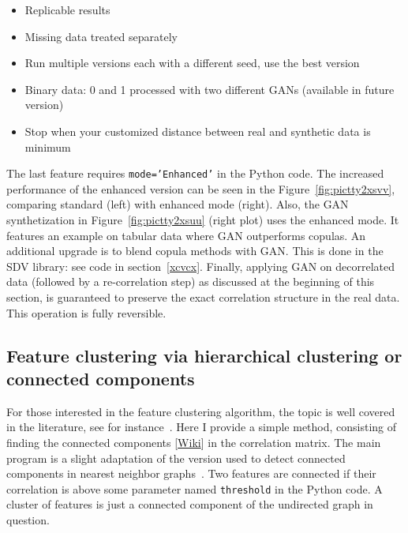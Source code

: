 \documentclass[oneside,10pt]{book}
\begin{document}
\begin{itemize}
\item Replicable results
\item Missing data treated separately
\item Run multiple versions each with a different seed, use the best version
\item Binary data: 0 and 1 processed with two different GANs (available in future version)
\item Stop when your customized distance between real and synthetic data is minimum 
\end{itemize}\vspace{1ex}

\noindent The last feature requires  \texttt{mode='Enhanced'} in the Python code. The increased performance of the enhanced version can be seen in the Figure~\ref{fig:pictty2xsvv}, comparing standard (left) with enhanced mode (right). Also, the GAN synthetization
 in Figure~\ref{fig:pictty2xsuu} (right plot) uses the enhanced mode. It features an example on tabular data where GAN outperforms copulas.  An additional upgrade is to blend copula methods with GAN. This is done in the SDV library: see code in
 section~\ref{xcvcx}. Finally, applying GAN on decorrelated data (followed by a re-correlation step) as discussed at the
 beginning of this section, is guaranteed to
 preserve the exact correlation structure in the real data. This operation is fully reversible.

\subsection{Feature clustering via hierarchical clustering or connected components}\label{dk6fb}

For those interested in the \textcolor{index}{feature clustering} algorithm,
 the topic is well covered in the literature, see for instance~\cite{fcnice}.  Here I provide a simple method, consisting of finding the \textcolor{index}{connected components} 
 [\href{https://en.wikipedia.org/wiki/Component_(graph_theory)}{Wiki}] in the correlation matrix. The main program is a slight adaptation of the version used to detect
 connected components in nearest neighbor graphs~\cite{vgelsevier}. 
 Two features are connected if their correlation is above some parameter named \texttt{threshold} in the Python code.  A cluster of features is just a connected component of the 
 \textcolor{index}{undirected graph} in question.   
\end{document}
